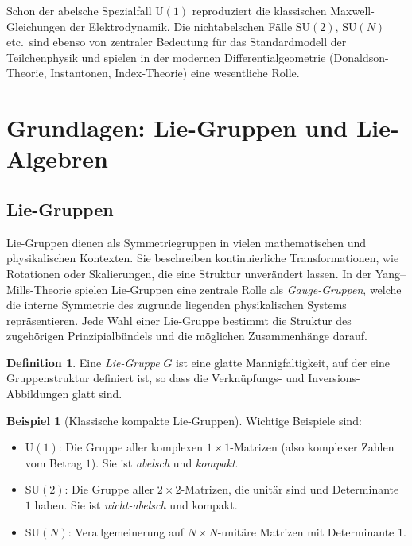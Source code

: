\documentclass[10pt, letterpaper]{article}
\theoremstyle{custom}
\theoremstyle{definition}
\newtheorem{definition}[theorem]{Definition}
\newtheorem{example}[theorem]{Beispiel}
\begin{document}
Schon der abelsche Spezialfall \(\mathrm{U}(1)\) reproduziert die klassischen Maxwell-Gleichungen der Elektrodynamik. Die nichtabelschen Fälle \(\mathrm{SU}(2)\), \(\mathrm{SU}(N)\) etc.\ sind ebenso von zentraler Bedeutung für das Standardmodell der Teilchenphysik und spielen in der modernen Differentialgeometrie (Donaldson-Theorie, Instantonen, Index-Theorie) eine wesentliche Rolle.

\section{Grundlagen: Lie-Gruppen und Lie-Algebren}

\subsection{Lie-Gruppen}
Lie-Gruppen dienen als Symmetriegruppen in vielen mathematischen und physikalischen Kontexten. Sie beschreiben kontinuierliche Transformationen, wie Rotationen oder Skalierungen, die eine Struktur unverändert lassen. In der Yang--Mills-Theorie spielen Lie-Gruppen eine zentrale Rolle als \emph{Gauge-Gruppen}, welche die interne Symmetrie des zugrunde liegenden physikalischen Systems repräsentieren. Jede Wahl einer Lie-Gruppe bestimmt die Struktur des zugehörigen Prinzipialbündels und die möglichen Zusammenhänge darauf.

\begin{definition}
Eine \emph{Lie-Gruppe} \(G\) ist eine glatte Mannigfaltigkeit, auf der eine Gruppenstruktur definiert ist, so dass die Verknüpfungs- und Inversions-Abbildungen glatt sind.
\end{definition}

\begin{example}[Klassische kompakte Lie-Gruppen] Wichtige Beispiele sind:
\begin{itemize}[leftmargin=1.2em]
  \item \(\mathrm{U}(1)\): Die Gruppe aller komplexen \(1\times 1\)-Matrizen (also komplexer Zahlen vom Betrag \(1\)). Sie ist \emph{abelsch} und \emph{kompakt}.
  \item \(\mathrm{SU}(2)\): Die Gruppe aller \(2\times 2\)-Matrizen, die unitär sind und Determinante \(1\) haben. Sie ist \emph{nicht-abelsch} und kompakt.
  \item \(\mathrm{SU}(N)\): Verallgemeinerung auf \(N\times N\)-unitäre Matrizen mit Determinante \(1\).
\end{itemize}
\end{example}
\end{document}
